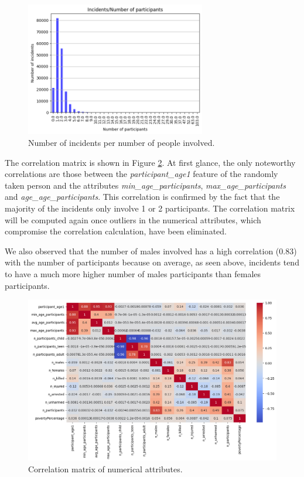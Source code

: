 \documentclass[11pt,a4paper]{report}
\begin{document}
\begin{figure}[h]
	\includegraphics[width=0.7\textwidth]{incidents_per_nparticipants}
	\centering
	\caption{Number of incidents per number of people involved.}
	\label{incidents_per_nparticipants}
\end{figure}

The correlation matrix is shown in Figure \ref{corr_matrix_du}.
At first glance, the only noteworthy correlations are those between the \textit{participant\_age1} feature of the randomly taken person and the attributes \textit{min\_age\_participants}, \textit{max\_age\_participants} and \textit{age\_age\_participants}.
This correlation is confirmed by the fact that the majority of the incidents only involve 1 or 2 participants. 
The correlation matrix will be computed again once outliers in the numerical attributes, which compromise the correlation calculation, have been eliminated.

We also observed that the number of males involved has a high correlation (0.83) with the number of participants because on average, as seen above, incidents tend to have a much more higher number of males participants than females participants.

\begin{figure}[h]
	\includegraphics[width=1\textwidth]{corr_matrix_du}
	\centering
	\caption{Correlation matrix of numerical attributes.}
	\label{corr_matrix_du}
\end{figure}
\end{document}
